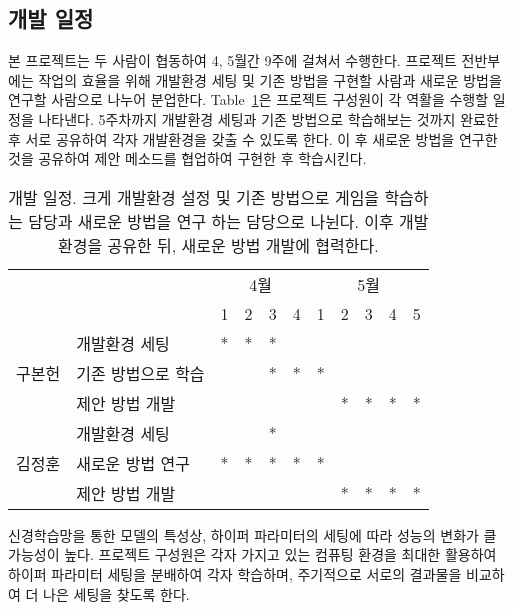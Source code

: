 \subsection{개발 일정}
\label{sec:dev:schedule}
본 프로젝트는 두 사람이 협동하여 4, 5월간 9주에 걸쳐서 수행한다.
프로젝트 전반부에는 작업의 효율을 위해 개발환경 세팅 및 기존 방법을 구현할 사람과 새로운 방법을 연구할 사람으로 나누어 분업한다.
Table~\ref{tab:schedule}은 프로젝트 구성원이 각 역활을 수행할 일정을 나타낸다.
5주차까지 개발환경 세팅과 기존 방법으로 학습해보는 것까지 완료한 후 서로 공유하여 각자 개발환경을 갖출 수 있도록 한다.
이 후 새로운 방법을 연구한 것을 공유하여 제안 메소드를 협업하여 구현한 후 학습시킨다.

\begin{table}[]
	\caption {
		개발 일정.
		크게 개발환경 설정 및 기존 방법으로 게임을 학습하는 담당과 새로운 방법을 연구 하는 담당으로 나뉜다.
		이후 개발환경을 공유한 뒤, 새로운 방법 개발에 협력한다.
	}
	\label{tab:schedule}
\begin{tabular}{clccccccccc}
\toprule
                     & \multicolumn{1}{c}{} & \multicolumn{4}{c}{4월} & \multicolumn{5}{c}{5월} \\
                     & \multicolumn{1}{c}{} & 1    & 2   & 3   & 4   & 1  & 2  & 3  & 4  & 5  \\
\midrule
\multirow{3}{*}{구본헌} & 개발환경 세팅              & *    & *   & *   &     &    &    &    &    &    \\
                     & 기존 방법으로 학습           &      &     & *   & *   & *  &    &    &    &    \\
                     & 제안 방법 개발             &      &     &     &     &    & *  & *  & *  & *  \\
\midrule
\multirow{3}{*}{김정훈} & 개발환경 세팅              &      &     & *   &     &    &    &    &    &    \\
                     & 새로운 방법 연구           & *    & *   & *   & *   & *  &    &    &    &    \\
                     & 제안 방법 개발             &      &     &     &     &    & *  & *  & *  & * \\
\bottomrule
\end{tabular}
\end{table}

신경학습망을 통한 모델의 특성상, 하이퍼 파라미터의 세팅에 따라 성능의 변화가 클 가능성이 높다.
프로젝트 구성원은 각자 가지고 있는 컴퓨팅 환경을 최대한 활용하여 하이퍼 파라미터 세팅을 분배하여 각자 학습하며, 주기적으로 서로의 결과물을 비교하여 더 나은 세팅을 찾도록 한다.

